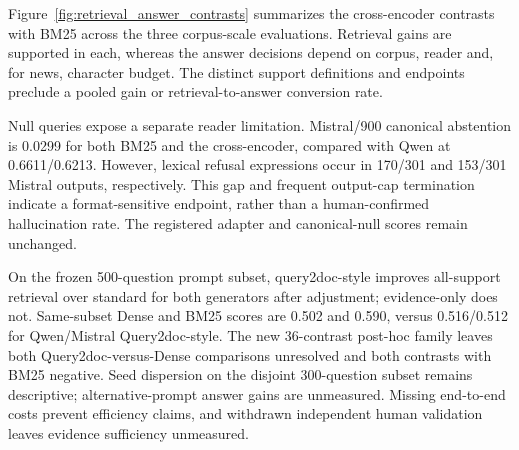 Figure~\ref{fig:retrieval_answer_contrasts} summarizes the cross-encoder contrasts with BM25 across the three corpus-scale evaluations. Retrieval gains are supported in each, whereas the answer decisions depend on corpus, reader and, for news, character budget. The distinct support definitions and endpoints preclude a pooled gain or retrieval-to-answer conversion rate.



Null queries expose a separate reader limitation. Mistral/900 canonical abstention is 0.0299 for both BM25 and the cross-encoder, compared with Qwen at 0.6611/0.6213. However, lexical refusal expressions occur in 170/301 and 153/301 Mistral outputs, respectively. This gap and frequent output-cap termination indicate a format-sensitive endpoint, rather than a human-confirmed hallucination rate. The registered adapter and canonical-null scores remain unchanged.

On the frozen 500-question prompt subset, query2doc-style improves all-support retrieval over standard for both generators after adjustment; evidence-only does not. Same-subset Dense and BM25 scores are 0.502 and 0.590, versus 0.516/0.512 for Qwen/Mistral Query2doc-style. The new 36-contrast post-hoc family leaves both Query2doc-versus-Dense comparisons unresolved and both contrasts with BM25 negative. Seed dispersion on the disjoint 300-question subset remains descriptive; alternative-prompt answer gains are unmeasured. Missing end-to-end costs prevent efficiency claims, and withdrawn independent human validation leaves evidence sufficiency unmeasured.
